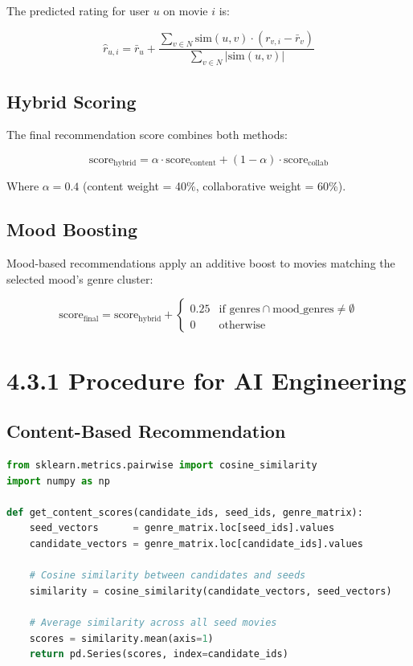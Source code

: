 \documentclass[12pt,a4paper]{report}
\begin{document}
The predicted rating for user $u$ on movie $i$ is:

\begin{equation}
\hat{r}_{u,i} = \bar{r}_u + \frac{\sum_{v \in N} \text{sim}(u,v) \cdot (r_{v,i} - \bar{r}_v)}{\sum_{v \in N} |\text{sim}(u,v)|}
\end{equation}

\subsection{Hybrid Scoring}

The final recommendation score combines both methods:

\begin{equation}
\text{score}_{\text{hybrid}} = \alpha \cdot \text{score}_{\text{content}} + (1-\alpha) \cdot \text{score}_{\text{collab}}
\end{equation}

Where $\alpha = 0.4$ (content weight = 40\%, collaborative weight = 60\%).

\subsection{Mood Boosting}

Mood-based recommendations apply an additive boost to movies matching the selected mood's genre cluster:

\begin{equation}
\text{score}_{\text{final}} = \text{score}_{\text{hybrid}} + \begin{cases} 0.25 & \text{if genres} \cap \text{mood\_genres} \neq \emptyset \\ 0 & \text{otherwise} \end{cases}
\end{equation}

\section{4.3.1 Procedure for AI Engineering}

\subsection{Content-Based Recommendation}

\begin{lstlisting}[language=Python, caption={Content-Based Filtering Implementation}]
from sklearn.metrics.pairwise import cosine_similarity
import numpy as np

def get_content_scores(candidate_ids, seed_ids, genre_matrix):
    seed_vectors      = genre_matrix.loc[seed_ids].values
    candidate_vectors = genre_matrix.loc[candidate_ids].values

    # Cosine similarity between candidates and seeds
    similarity = cosine_similarity(candidate_vectors, seed_vectors)

    # Average similarity across all seed movies
    scores = similarity.mean(axis=1)
    return pd.Series(scores, index=candidate_ids)
\end{lstlisting}
\end{document}
